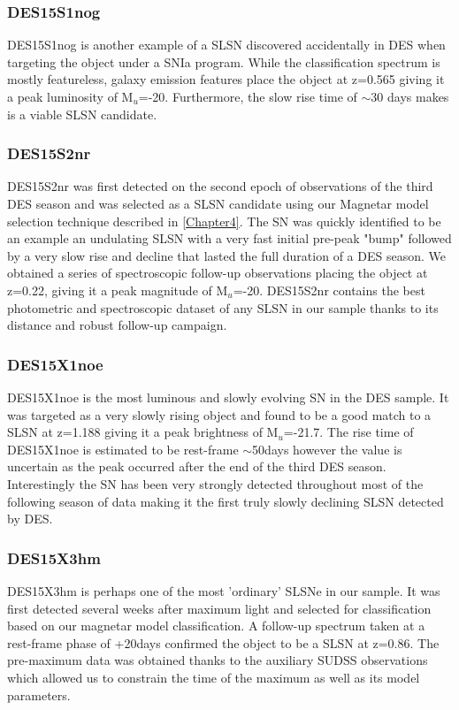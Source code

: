 \subsubsection{DES15S1nog}
DES15S1nog is another example of a SLSN discovered accidentally in DES when targeting the object under a SNIa program. While the classification spectrum is mostly featureless, galaxy emission features place the object at z=0.565 giving it a peak luminosity of M$_u$=-20. Furthermore, the slow rise time of $\sim$30 days makes is a viable SLSN candidate.

\subsubsection{DES15S2nr}
DES15S2nr was first detected on the second epoch of observations of the third DES season and was selected as a SLSN candidate using our Magnetar model selection technique described in \cref{Chapter4}. The SN was quickly identified to be an example an undulating SLSN with a very fast initial pre-peak "bump" followed by a very slow rise and decline that lasted the full duration of a DES season. We obtained a series of spectroscopic follow-up observations placing the object at z=0.22, giving it a peak magnitude of M$_u$=-20. DES15S2nr contains the best photometric and spectroscopic dataset of any SLSN in our sample thanks to its distance and robust follow-up campaign.

\subsubsection{DES15X1noe}
DES15X1noe is the most luminous and slowly evolving SN in the DES sample. It was targeted as a very slowly rising object and found to be a good match to a SLSN at z=1.188 giving it a peak brightness of M$_u$=-21.7. The rise time of DES15X1noe is estimated to be rest-frame $\sim$50days however the value is uncertain as the peak occurred after the end of the third DES season. Interestingly the SN has been very strongly detected throughout most of the following season of data making it the first truly slowly declining SLSN detected by DES.

\subsubsection{DES15X3hm}
DES15X3hm is perhaps one of the most 'ordinary' SLSNe in our sample. It was first detected several weeks after maximum light and selected for classification based on our magnetar model classification. A follow-up spectrum taken at a rest-frame phase of +20days confirmed the object to be a SLSN at z=0.86. The pre-maximum data was obtained thanks to the auxiliary SUDSS observations which allowed us to constrain the time of the maximum as well as its model parameters.


